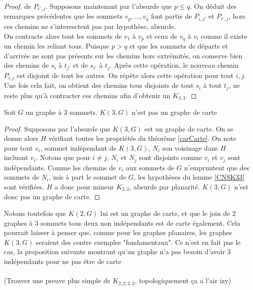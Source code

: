 \documentclass{scrartcl}
\begin{document}
\begin{flushleft}
\begin{proof}
    de $P_{i',j}$. Supposons maintenant par l'absurde que $p \leq q$. On déduit des remarques précédentes que les sommets $v_p, ..., v_q$
    font partie de $P_{i,j'}$ et $P_{i',j}$, hors ces chemins ne s'interesctent pas par hypothèse, absurde.\\
    On contracte alors tout les sommets de $v_1$ à $v_p$ et ceux de $v_q$ à $v_l$ comme il existe un chemin les reliant tous. Puisque
    $p > q$ et que les sommets de départs et d'arrivée ne sont pas présents sur les chemins hors extrémités,
    on conserve bien des chemins de $s_i$ à $t_{j'}$ et de $s_{i'}$ à $t_j$. Après cette opération, le nouveau chemin $P_{i,j}$ est disjoint
    de tout les autres. On répète alors cette opération pour tout $i,j$.\\
    Une fois cela fait, on obtient des chemins tous disjoints de tout $s_i$ à tout $t_j$, ne reste plus qu'à contracter ces chemins afin
    d'obtenir un $K_{3,3}$.
\end{proof}


\begin{prop}\label{K3G}
    Soit $G$ un graphe à $3$ sommets. $K(3, G)$ n'est pas un graphe de carte
\end{prop}

\begin{proof}
    Supposons par l'absurde que $K(3, G)$ est un graphe de carte. On se donne alors $H$ vérifiant toutes les propriétés
    du théorème \ref{carCarte}. On note pour tout $v_i$, sommet indépendant de $K(3, G)$, $N_i$ son voisinage dans $H$
    incluant $v_i$. Notons que pour $i \neq j$, $N_i$ et $N_j$ sont disjoints comme $v_i$ et $v_j$ sont indépendants.
    Comme les chemins de $v_i$ aux sommets de $G$ n'empruntent que des sommets de $N_i$, mis à part le sommet de $G$,
    les hypothèses du lemme \ref{CNSK33} sont vérifiées. $H$ a donc pour mineur $K_{3,3}$, absurde par planarité.
    $K(3, G)$ n'est donc pas un graphe de carte.
\end{proof}

Notons toutefois que $K(2, G)$ lui est un graphe de carte, et que le join de $2$ graphes à $3$ sommets tous deux non indépendants
est de carte également. Cela pourrait laisser à penser que, comme pour les graphes planaires, les graphes $K(3, G)$ seraient des
contre exemples "fondamentaux". Ce n'est en fait pas le cas, la proposition suivante montrant qu'un graphe n'a pas besoin
d'avoir $3$ indépendants pour ne pas être de carte
\\~\\
(Trouver une preuve plus simple de $K_{2,2,2,2}$, topologiquement ça a l'air izy)


\end{flushleft}
\end{document}
